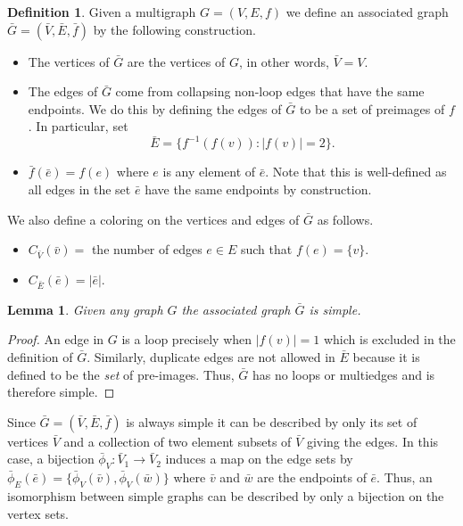 \documentclass[amsmath,secnumarabic,floatfix,amssymb,nofootinbib,nobibnotes,letterpaper,11pt,tightenlines,showkeys]{revtex4}
\newtheorem{lemma}[theorem]{Lemma}
\theoremstyle{definition}
\newtheorem{definition}[theorem]{Definition}
\newcommand{\abs}[1]{\lvert#1\rvert}
\let\mgp=\marginpar \marginparwidth18mm \marginparsep1mm
\def\marginpar#1{\mgp{\raggedright\tiny #1}}
\let\lbl=\label
\def\label#1{\lbl{#1}\ifinner\else\marginpar{\ref{#1} #1}\ignorespaces\fi}
\begin{document}
\begin{definition}{\label{gbar}}
	Given a multigraph $G=(V,E,f)$ we define an associated graph $\bar{G} = (\bar{V}, \bar{E}, \bar{f})$ by the following construction. 

	\begin{itemize}
		\item The vertices of $\bar{G}$ are the vertices of $G$, in other words, $\bar{V} = V$.
		\item The edges of $\bar{G}$ come from collapsing non-loop edges that have the same endpoints. We do this by defining the edges of $\bar{G}$ to be a set of preimages of $f$. In particular, set $$\bar{E} =  \{f^{-1}(f(v)) : \abs{f(v)} = 2\}.$$
		\item $\bar{f}(\bar{e}) = f(e)$ where $e$ is any element of $\bar{e}$. Note that this is well-defined as all edges in the set $\bar{e}$ have the same endpoints by construction.
		
	\end{itemize}

	We also define a coloring on the vertices and edges of $\bar{G}$ as follows.
	
	\begin{itemize}
		\item $C_{\bar{V}}(\bar{v}) = $ the number of edges $e \in E$ such that $f(e) = \{v\}$.
		\item $C_{\bar{E}}(\bar{e}) = \abs{\bar{e}}$.  %
	\end{itemize}

\end{definition}

\begin{lemma}
	Given any graph $G$ the associated graph $\bar{G}$ is simple.
\end{lemma}

\begin{proof}
	An edge in $G$ is a loop precisely when $\abs{f(v)} = 1$ which is excluded in the definition of $\bar{G}$. Similarly, duplicate edges are not allowed in $\bar{E}$ because it is defined to be the \emph{set} of pre-images. Thus, $\bar{G}$ has no loops or multiedges and is therefore simple.
\end{proof}

Since $\bar{G} = (\bar{V}, \bar{E}, \bar{f})$ is always simple it can be described by only its set of vertices $\bar{V}$ and a collection of two element subsets of $\bar{V}$ giving the edges. In this case, a bijection $\bar{\phi}_V: \bar{V}_1 \rightarrow \bar{V}_2$ induces a map on the edge sets by $\bar{\phi}_E(\bar{e}) = \{\bar{\phi}_V(\bar{v}),\bar{\phi}_V(\bar{w})\}$ where $\bar{v}$ and $\bar{w}$ are the endpoints of $\bar{e}$. Thus, an isomorphism between simple graphs can be described by only a bijection on the vertex sets.
\end{document}
